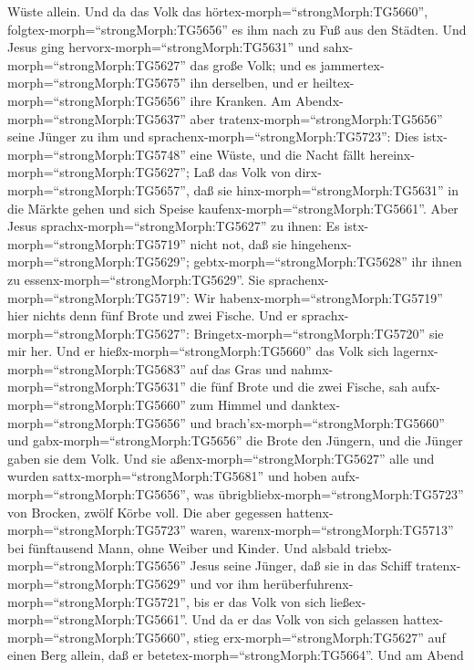 Wüste allein. Und da das Volk das hörtex-morph=``strongMorph:TG5660'',
folgtex-morph=``strongMorph:TG5656'' es ihm nach zu Fuß aus den Städten.
 Und Jesus ging hervorx-morph=``strongMorph:TG5631'' und
sahx-morph=``strongMorph:TG5627'' das große Volk; und es
jammertex-morph=``strongMorph:TG5675'' ihn derselben, und er
heiltex-morph=``strongMorph:TG5656'' ihre Kranken.  Am
Abendx-morph=``strongMorph:TG5637'' aber
tratenx-morph=``strongMorph:TG5656'' seine Jünger zu ihm und
sprachenx-morph=``strongMorph:TG5723'': Dies
istx-morph=``strongMorph:TG5748'' eine Wüste, und die Nacht fällt
hereinx-morph=``strongMorph:TG5627''; Laß das Volk von
dirx-morph=``strongMorph:TG5657'', daß sie
hinx-morph=``strongMorph:TG5631'' in die Märkte gehen und sich Speise
kaufenx-morph=``strongMorph:TG5661''.  Aber Jesus
sprachx-morph=``strongMorph:TG5627'' zu ihnen: Es
istx-morph=``strongMorph:TG5719'' nicht not, daß sie
hingehenx-morph=``strongMorph:TG5629'';
gebtx-morph=``strongMorph:TG5628'' ihr ihnen zu
essenx-morph=``strongMorph:TG5629''.  Sie
sprachenx-morph=``strongMorph:TG5719'': Wir
habenx-morph=``strongMorph:TG5719'' hier nichts denn fünf Brote und zwei
Fische.  Und er sprachx-morph=``strongMorph:TG5627'':
Bringetx-morph=``strongMorph:TG5720'' sie mir her.  Und er
hießx-morph=``strongMorph:TG5660'' das Volk sich
lagernx-morph=``strongMorph:TG5683'' auf das Gras und
nahmx-morph=``strongMorph:TG5631'' die fünf Brote und die zwei Fische,
sah aufx-morph=``strongMorph:TG5660'' zum Himmel und
danktex-morph=``strongMorph:TG5656'' und
brach'sx-morph=``strongMorph:TG5660'' und
gabx-morph=``strongMorph:TG5656'' die Brote den Jüngern, und die Jünger
gaben sie dem Volk.  Und sie
aßenx-morph=``strongMorph:TG5627'' alle und wurden
sattx-morph=``strongMorph:TG5681'' und hoben
aufx-morph=``strongMorph:TG5656'', was
übrigbliebx-morph=``strongMorph:TG5723'' von Brocken, zwölf Körbe voll.
 Die aber gegessen hattenx-morph=``strongMorph:TG5723''
waren, warenx-morph=``strongMorph:TG5713'' bei fünftausend Mann, ohne
Weiber und Kinder.  Und alsbald
triebx-morph=``strongMorph:TG5656'' Jesus seine Jünger, daß sie in das
Schiff tratenx-morph=``strongMorph:TG5629'' und vor ihm
herüberfuhrenx-morph=``strongMorph:TG5721'', bis er das Volk von sich
ließex-morph=``strongMorph:TG5661''.  Und da er das Volk
von sich gelassen hattex-morph=``strongMorph:TG5660'', stieg
erx-morph=``strongMorph:TG5627'' auf einen Berg allein, daß er
betetex-morph=``strongMorph:TG5664''. Und am Abend
